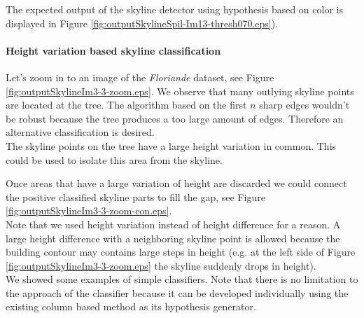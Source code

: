 The expected output of the skyline detector using hypothesis based on color is
displayed in Figure \ref{fig:outputSkylineSpil-Im13-thresh070.eps}). 
\clearpage

\paragraph{Height variation based skyline classification}
Let's zoom in to an image of the \emph{Floriande} dataset, see Figure \ref{fig:outputSkylineIm3-3-zoom.eps}.
We observe that many outlying skyline points are located at the tree.  The algorithm based on the
first $n$ sharp edges wouldn't be robust because the tree produces a too large
amount of edges. Therefore an alternative classification is desired.\\

The skyline points on the tree have a large height variation in common.
This could be used to isolate this area from the skyline.

Once areas that have a large variation of height are discarded we could connect
the positive classified skyline parts to fill the gap, see Figure
\ref{fig:outputSkylineIm3-3-zoom-con.eps}.\\

Note that we used height variation instead of height difference for a reason.  A
large height difference with a neighboring skyline point is allowed because the
building contour may contains large steps in height (e.g. at the left side of
Figure \ref{fig:outputSkylineIm3-3-zoom.eps} the skyline suddenly drops in
height).\\

We showed some examples of simple classifiers. Note that there is no limitation
to the approach of the classifier because it can be developed individually using
the existing column based method as its hypothesis generator.

\newpage
{}
\clearpage




